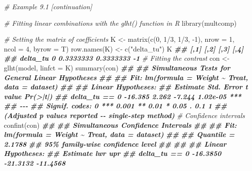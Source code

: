 \documentclass[
  12pt,
]{book}
\newenvironment{Shaded}{\begin{snugshade}}{\end{snugshade}}
\newcommand{\AttributeTok}[1]{\textcolor[rgb]{0.77,0.63,0.00}{#1}}
\newcommand{\CommentTok}[1]{\textcolor[rgb]{0.56,0.35,0.01}{\textit{#1}}}
\newcommand{\DecValTok}[1]{\textcolor[rgb]{0.00,0.00,0.81}{#1}}
\newcommand{\DocumentationTok}[1]{\textcolor[rgb]{0.56,0.35,0.01}{\textbf{\textit{#1}}}}
\newcommand{\FunctionTok}[1]{\textcolor[rgb]{0.00,0.00,0.00}{#1}}
\newcommand{\NormalTok}[1]{#1}
\newcommand{\OtherTok}[1]{\textcolor[rgb]{0.56,0.35,0.01}{#1}}
\newcommand{\SpecialCharTok}[1]{\textcolor[rgb]{0.00,0.00,0.00}{#1}}
\newcommand{\StringTok}[1]{\textcolor[rgb]{0.31,0.60,0.02}{#1}}
\begin{document}
\begin{Shaded}
\begin{Highlighting}[]
\CommentTok{\# Example 9.1 [continuation]}

\CommentTok{\# Fitting linear combinations with the \textquotesingle{}glht()\textquotesingle{} function in R}
\FunctionTok{library}\NormalTok{(multcomp)}

\CommentTok{\# Setting the matrix of coefficients}
\NormalTok{K }\OtherTok{\textless{}{-}} \FunctionTok{matrix}\NormalTok{(}\FunctionTok{c}\NormalTok{(}\DecValTok{0}\NormalTok{, }\DecValTok{1}\SpecialCharTok{/}\DecValTok{3}\NormalTok{, }\DecValTok{1}\SpecialCharTok{/}\DecValTok{3}\NormalTok{, }\SpecialCharTok{{-}}\DecValTok{1}\NormalTok{),}
            \AttributeTok{nrow =} \DecValTok{1}\NormalTok{, }\AttributeTok{ncol =} \DecValTok{4}\NormalTok{, }\AttributeTok{byrow =}\NormalTok{ T)}
\FunctionTok{row.names}\NormalTok{(K) }\OtherTok{\textless{}{-}} \FunctionTok{c}\NormalTok{(}\StringTok{"delta\_tu"}\NormalTok{)}
\NormalTok{K}
\DocumentationTok{\#\#          [,1]      [,2]      [,3] [,4]}
\DocumentationTok{\#\# delta\_tu    0 0.3333333 0.3333333   {-}1}
\CommentTok{\# Fitting the contrast}
\NormalTok{con }\OtherTok{\textless{}{-}} \FunctionTok{glht}\NormalTok{(model, }\AttributeTok{linfct =}\NormalTok{ K)}
\FunctionTok{summary}\NormalTok{(con)}
\DocumentationTok{\#\# }
\DocumentationTok{\#\#   Simultaneous Tests for General Linear Hypotheses}
\DocumentationTok{\#\# }
\DocumentationTok{\#\# Fit: lm(formula = Weight \textasciitilde{} Treat, data = dataset)}
\DocumentationTok{\#\# }
\DocumentationTok{\#\# Linear Hypotheses:}
\DocumentationTok{\#\#               Estimate Std. Error t value Pr(\textgreater{}|t|)    }
\DocumentationTok{\#\# delta\_tu == 0  {-}16.385      2.262  {-}7.244 1.02e{-}05 ***}
\DocumentationTok{\#\# {-}{-}{-}}
\DocumentationTok{\#\# Signif. codes:  0 \textquotesingle{}***\textquotesingle{} 0.001 \textquotesingle{}**\textquotesingle{} 0.01 \textquotesingle{}*\textquotesingle{} 0.05 \textquotesingle{}.\textquotesingle{} 0.1 \textquotesingle{} \textquotesingle{} 1}
\DocumentationTok{\#\# (Adjusted p values reported {-}{-} single{-}step method)}
\CommentTok{\# Confidence intervals }
\FunctionTok{confint}\NormalTok{(con)}
\DocumentationTok{\#\# }
\DocumentationTok{\#\#   Simultaneous Confidence Intervals}
\DocumentationTok{\#\# }
\DocumentationTok{\#\# Fit: lm(formula = Weight \textasciitilde{} Treat, data = dataset)}
\DocumentationTok{\#\# }
\DocumentationTok{\#\# Quantile = 2.1788}
\DocumentationTok{\#\# 95\% family{-}wise confidence level}
\DocumentationTok{\#\#  }
\DocumentationTok{\#\# }
\DocumentationTok{\#\# Linear Hypotheses:}
\DocumentationTok{\#\#               Estimate lwr      upr     }
\DocumentationTok{\#\# delta\_tu == 0 {-}16.3850 {-}21.3132 {-}11.4568}
\end{Highlighting}
\end{Shaded}
\end{document}
